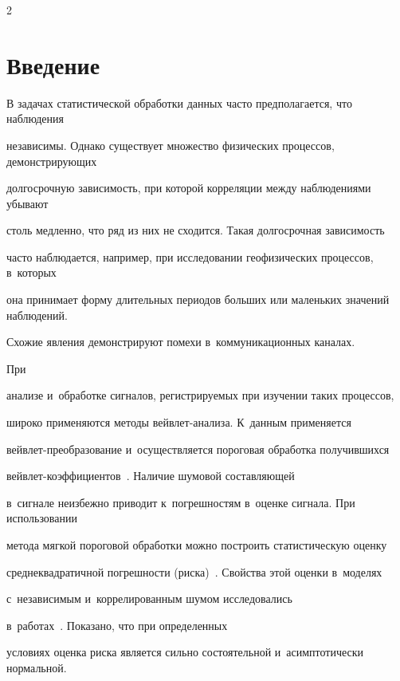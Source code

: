 \begin{multicols}{2}



\label{st\stat}



\section{Введение}



В задачах статистической обработки данных час\-то предполагается, что наблюдения 

независимы. Однако существует множество физических процессов, де\-мон\-ст\-ри\-ру\-ющих 

долгосрочную за\-ви\-си\-мость, при которой корреляции между наблюдениями убывают 

столь медленно, что ряд из них не сходится. Такая долгосрочная за\-ви\-си\-мость 

час\-то наблюдается, например, при исследовании геофизических процессов, в~которых 

она принимает форму длительных периодов больших или маленьких значений наблюдений. 

Схожие явления демонстрируют помехи в~коммуникационных каналах. 



При 

анализе и~обработке сигналов, ре\-гист\-ри\-ру\-емых при изучении таких процессов, 

широко применяют\-ся методы вейв\-лет-ана\-ли\-за. К~данным применяется 

вейв\-лет-пре\-об\-ра\-зо\-ва\-ние и~осуществляется пороговая обработка получившихся 

вейв\-лет-ко\-эф\-фи\-ци\-ен\-тов~\cite{Mall99}. Наличие шумовой со\-став\-ля\-ющей 

в~сигнале неизбежно приводит к~погрешностям в~оценке сигнала. При использовании 

метода мягкой пороговой обработки мож\-но по\-стро\-ить статистическую оценку 

среднеквадратичной по\-греш\-ности (рис\-ка)~\cite{DonJ95}. Свойства этой оценки в~моделях 

с~независимым и~коррелированным шумом исследовались 

в~работах~\cite{Mar09,MSH10-1,SH12-1,ESH14,SH16}. Показано, что при определенных 

условиях оценка рис\-ка является сильно со\-сто\-ятель\-ной и~асимптотически нормальной.




\end{multicols}
